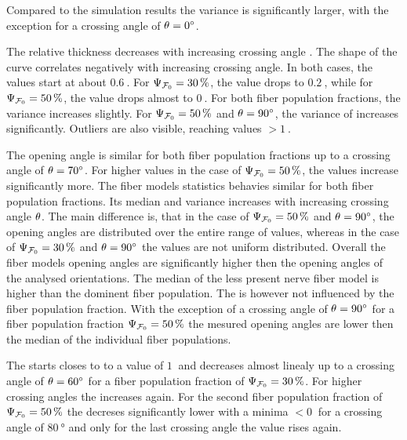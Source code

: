 Compared to the simulation results the \bvariance{} variance is significantly larger, with the exception for a crossing angle of $\textnormal{$\theta$}=\SI{0}{\degree}$.
\par
The relative thickness \trel{} decreases with increasing crossing angle \modelOmega{}.
The shape of the curve correlates negatively with increasing crossing angle.
In both cases, the \trel{} values start at about $\SI{0.6}{}$.
For $\textnormal{$\Psi_{\textnormal{$\mathcal{F}_0$}}$} = \SI{30}{\percent}$, the \trel{} value drops to $\SI{0.2}{}$, while for $\textnormal{$\Psi_{\textnormal{$\mathcal{F}_0$}}$} = \SI{50}{\percent}$, the \trel{} value drops almost to $\SI{0}{}$.
For both fiber population fractions, the variance increases slightly.
For $\textnormal{$\Psi_{\textnormal{$\mathcal{F}_0$}}$} = \SI{50}{\percent}$ and $\textnormal{$\theta$} = \SI{90}{\degree}$, the variance of \trel{} increases significantly.
Outliers are also visible, reaching \trel{} values $>\SI{1}{}$.
\par
\par
The opening angle \openingAngle{} is similar for both fiber population fractions up to a crossing angle of $\textnormal{$\theta$}=\SI{70}{\degree}$.
For higher values in the case of $\textnormal{$\Psi_{\textnormal{$\mathcal{F}_0$}}$} = \SI{50}{\percent}$, the values increase significantly more.
The fiber models statistics behavies similar for both fiber population fractions.
Its median and \bvariance{} variance increases with increasing crossing angle $\textnormal{$\theta$}$.
The main difference is, that in the case of $\textnormal{$\Psi_{\textnormal{$\mathcal{F}_0$}}$} = \SI{50}{\percent}$ and $\textnormal{$\theta$} = \SI{90}{\degree}$, the opening angles are distributed over the entire range of values, whereas in the case of $\textnormal{$\Psi_{\textnormal{$\mathcal{F}_0$}}$} = \SI{30}{\percent}$ and $\textnormal{$\theta$} = \SI{90}{\degree}$ the values are not uniform distributed.
Overall the fiber models opening angles are significantly higher then the opening angles of the analysed orientations.
The median of the less present nerve fiber model is higher than the dominent fiber population.
The \bvariance{} is however not influenced by the fiber population fraction.
With the exception of a crossing angle of $\textnormal{$\theta$}=\SI{90}{\degree}$ for a fiber population fraction $\textnormal{$\Psi_{\textnormal{$\mathcal{F}_0$}}$}=\SI{50}{\percent}$ the mesured opening angles are lower then the median of the individual fiber populations.
\par
The \accvalue{} starts closes to to a value of $\SI{1}{}$ and decreases almost linealy up to a crossing angle of $\textnormal{$\theta$} = \SI{60}{\degree}$ for a fiber population fraction of $\textnormal{$\Psi_{\textnormal{$\mathcal{F}_0$}}$} = \SI{30}{\percent}$.
For higher crossing angles the \accvalue{} increases again.
For the second fiber population fraction of $\textnormal{$\Psi_{\textnormal{$\mathcal{F}_0$}}$} = \SI{50}{\percent}$ the \accvalue{} decreses significantly lower with a minima $<\SI{0}{}$ for a crossing angle of $\SI{80}{\degree}$ and only for the last crossing angle the value rises again.
% 
% 
%
